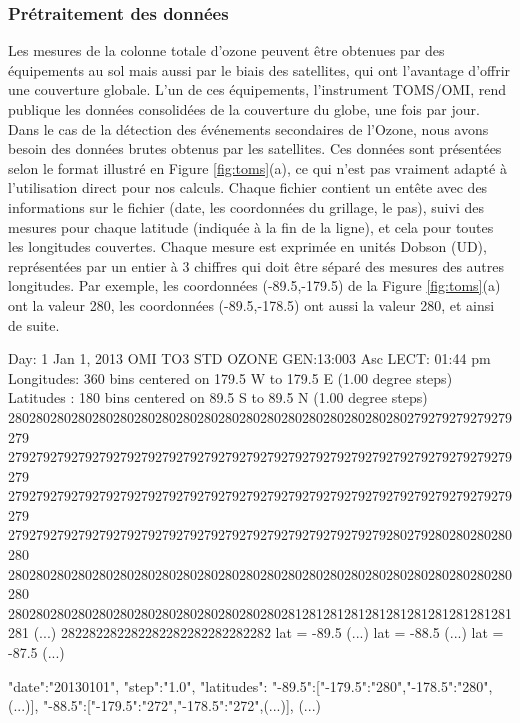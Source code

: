 \subsubsection*{Prétraitement des données}

Les mesures de la colonne totale d'ozone peuvent être obtenues par des équipements au sol mais aussi par le biais des satellites, qui ont l'avantage d'offrir une couverture globale. L'un de ces équipements, l'instrument TOMS/OMI, rend publique les données consolidées de la couverture du globe, une fois par jour. Dans le cas de la détection des événements secondaires de l'Ozone, nous avons besoin des données brutes obtenus par les satellites. Ces données sont présentées selon le format illustré en Figure \ref{fig:toms}(a), ce qui n'est pas vraiment adapté à l'utilisation direct pour nos calculs. Chaque fichier contient un entête avec des informations sur le fichier (date, les coordonnées du grillage, le pas), suivi des mesures pour chaque latitude (indiquée à la fin de la ligne), et cela pour toutes les longitudes couvertes. Chaque mesure est exprimée en unités Dobson (UD), représentées par un entier à 3 chiffres qui doit être séparé des mesures des autres longitudes. Par exemple, les coordonnées (-89.5,-179.5) de la Figure \ref{fig:toms}(a) ont la valeur 280, les coordonnées (-89.5,-178.5) ont aussi la valeur 280, et ainsi de suite.   

\begin{myverbbox}[\tiny]{\TOMS}
	Day:   1 Jan  1, 2013    OMI TO3    STD OZONE    GEN:13:003 Asc LECT: 01:44 pm 
	Longitudes:  360 bins centered on 179.5  W  to 179.5  E   (1.00 degree steps)
	Latitudes :  180 bins centered on  89.5  S  to  89.5  N   (1.00 degree steps)
	280280280280280280280280280280280280280280280280280280280279279279279279279
	279279279279279279279279279279279279279279279279279279279279279279279279279
	279279279279279279279279279279279279279279279279279279279279279279279279279
	279279279279279279279279279279279279279279279279279279280279280280280280280
	280280280280280280280280280280280280280280280280280280280280280280280280280
	280280280280280280280280280280280280280281281281281281281281281281281281281
	(...)
	282282282282282282282282282282   lat =  -89.5
	(...)   lat =  -88.5
	(...)   lat =  -87.5
	(...)
\end{myverbbox}

\begin{myverbbox}[\tiny]{\JSON}
	{
		"date":"20130101",
		"step":"1.0",
		"latitudes":{
			"-89.5":["-179.5":"280","-178.5":"280",(...)],
			"-88.5":["-179.5":"272","-178.5":"272",(...)],
			(...)
		}
	}
\end{myverbbox}

